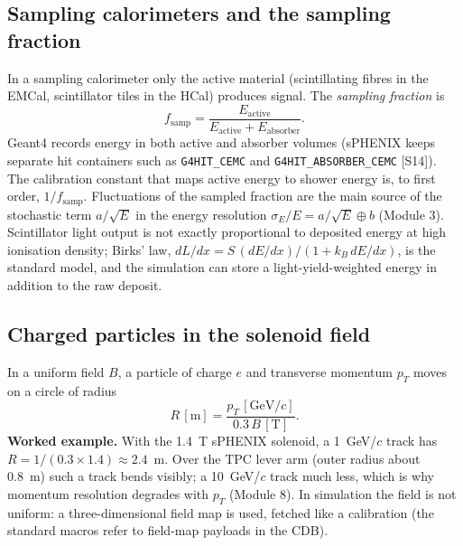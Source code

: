 \documentclass[11pt,letterpaper]{article}
\begin{document}
\subsection{Sampling calorimeters and the sampling fraction}
In a sampling calorimeter only the active material (scintillating fibres in the EMCal, scintillator tiles in the HCal) produces signal.
The \emph{sampling fraction} is
\begin{equation}
f_{\mathrm{samp}} = \frac{E_{\mathrm{active}}}{E_{\mathrm{active}}+E_{\mathrm{absorber}}}.
\end{equation}
Geant4 records energy in both active and absorber volumes (sPHENIX keeps separate hit containers such as \texttt{G4HIT\_CEMC} and \texttt{G4HIT\_ABSORBER\_CEMC} [S14]).
The calibration constant that maps active energy to shower energy is, to first order, $1/f_{\mathrm{samp}}$.
Fluctuations of the sampled fraction are the main source of the stochastic term $a/\sqrt{E}$ in the energy resolution
$\sigma_E/E = a/\sqrt{E}\oplus b$ (Module 3).
Scintillator light output is not exactly proportional to deposited energy at high ionisation density; Birks' law,
$dL/dx = S\,(dE/dx)/(1+k_B\,dE/dx)$, is the standard model, and the simulation can store a light-yield-weighted energy in addition to the raw deposit.

\subsection{Charged particles in the solenoid field}
In a uniform field $B$, a particle of charge $e$ and transverse momentum $p_T$ moves on a circle of radius
\begin{equation}
R\,[\mathrm{m}] = \frac{p_T\,[\mathrm{GeV}/c]}{0.3\,B\,[\mathrm{T}]}.
\end{equation}
\textbf{Worked example.} With the 1.4~T sPHENIX solenoid, a 1~GeV/$c$ track has $R=1/(0.3\times1.4)\approx2.4$~m.
Over the TPC lever arm (outer radius about 0.8~m) such a track bends visibly; a 10~GeV/$c$ track much less, which is why momentum resolution degrades with $p_T$ (Module 8).
In simulation the field is not uniform: a three-dimensional field map is used, fetched like a calibration (the standard macros refer to field-map payloads in the CDB).
\end{document}
